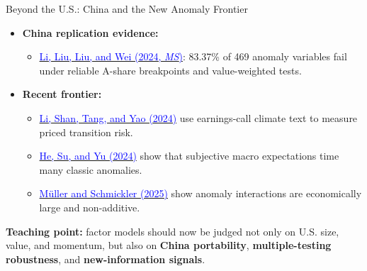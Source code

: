\documentclass{beamer}
\begin{document}
\begin{frame}{Beyond the U.S.: China and the New Anomaly Frontier}
    \begin{itemize}
        \item \textbf{China replication evidence:}
        \begin{itemize}
            \item \href{https://doi.org/10.1287/mnsc.2023.4904}{\textcolor{blue}{Li, Liu, Liu, and Wei (2024, \textit{MS})}}: 83.37\% of 469 anomaly variables fail under reliable A-share breakpoints and value-weighted tests.
        \end{itemize}
        \item \textbf{Recent frontier:}
        \begin{itemize}
            \item \href{https://doi.org/10.1093/rfs/hhad094}{\textcolor{blue}{Li, Shan, Tang, and Yao (2024)}} use earnings-call climate text to measure priced transition risk.
            \item \href{https://doi.org/10.1016/j.jfineco.2024.103952}{\textcolor{blue}{He, Su, and Yu (2024)}} show that subjective macro expectations time many classic anomalies.
            \item \href{https://doi.org/10.1093/rapstu/raaf001}{\textcolor{blue}{M\"uller and Schmickler (2025)}} show anomaly interactions are economically large and non-additive.
        \end{itemize}
    \end{itemize}

    \vspace{0.2cm}
    \textbf{Teaching point:} factor models should now be judged not only on U.S. size, value, and momentum, but also on \textbf{China portability}, \textbf{multiple-testing robustness}, and \textbf{new-information signals}.
\end{frame}
\end{document}
